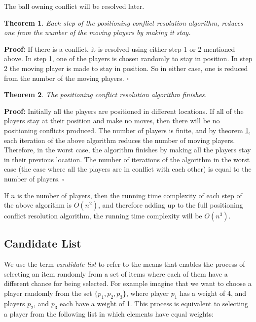 \documentclass[12pt,titlepage,a4paper]{article}
\newtheorem{theorem}{Theorem}
\begin{document}
The ball owning conflict will be resolved later.

\begin{theorem} \label{th:plstay}
Each step of the positioning conflict resolution algorithm, reduces one from the number of the moving players by making it stay.
\end{theorem}

\noindent
\textbf{Proof:} If there is a conflict, it is resolved using either step 1 or 2 mentioned above. In step 1, one of the players is chosen randomly to stay in position. In step 2 the moving player is made to stay in position. So in either case, one is reduced from the number of the moving players. $\square$

\begin{theorem}
The positioning conflict resolution algorithm finishes.
\end{theorem}

\noindent
\textbf{Proof:} Initially all the players are positioned in different locations. If all of the players stay at their position and make no moves, then there will be no positioning conflicts produced. The number of players is finite, and by theorem \ref{th:plstay}, each iteration of the above algorithm reduces the number of moving players. Therefore, in the worst case, the algorithm finishes by making all the players stay in their previous location. The number of iterations of the algorithm in the worst case (the case where all the players are in conflict with each other) is equal to the number of players. $\square$

\bigskip
If $n$ is the number of players, then the running time complexity of each step of the above algorithm is $O(n^2)$, and therefore adding up to the full positioning conflict resolution algorithm, the running time complexity will be $O(n^3)$.

\subsection{Candidate List}

We use the term \emph{candidate list} to refer to the means that enables the process of selecting an item randomly from a set of items where each of them have a different chance for being selected. For example imagine that we want to choose a player randomly from the set $\{ p_1, p_2, p_3 \}$, where player $p_1$ has a weight of 4, and players $p_2$, and $p_3$ each have a weight of 1. This process is equivalent to selecting a player from the following list in which elements have equal weights:
\end{document}
